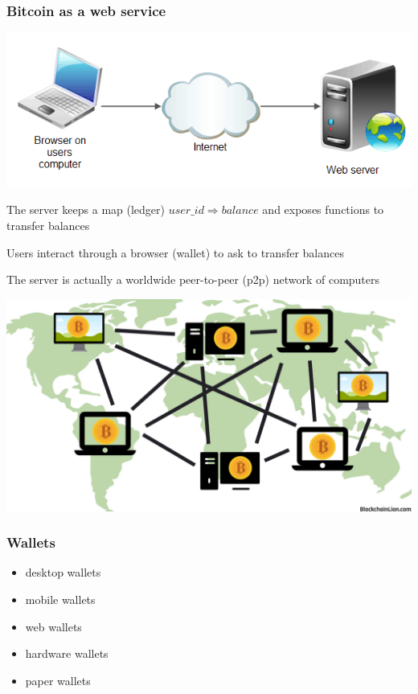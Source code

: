 \documentclass[11pt]{beamer}  %
\begin{document}
\begin{frame}\frametitle{Bitcoin as a web service}

  \begin{center}
    \includegraphics[scale=.3,clip=false]{pictures/web-server.png}
  \end{center}

  \medskip

  The server keeps a map (\alert{ledger}) $\mathit{user\_id}\Rightarrow\mathit{balance}$
  and exposes functions to transfer balances

  \medskip

  Users interact through a browser (\alert{wallet}) to ask to transfer balances

  \medskip
  The server is actually a worldwide peer-to-peer (p2p) network of computers

  \begin{center}
    \includegraphics[scale=.13,clip=false]{pictures/distributed.png}
  \end{center}

\end{frame}

\begin{frame}\frametitle{Wallets}

  \begin{itemize}
  \item desktop wallets
  \item mobile wallets
  \item web wallets
  \item hardware wallets
  \item paper wallets
  \end{itemize}
  
\end{frame}
\end{document}
